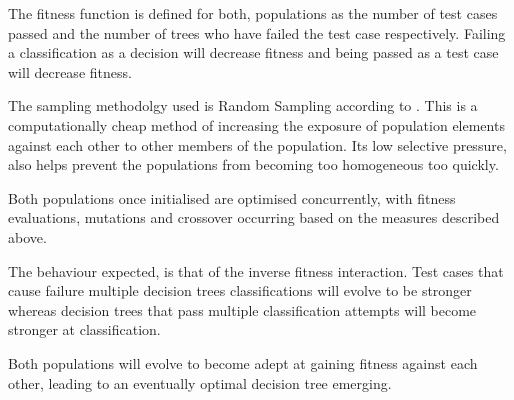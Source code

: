\documentclass[12pt]{article}
\begin{document}
The fitness function is defined for both, populations as the number of test cases passed and the number of trees who have failed the test case respectively. Failing a classification as a decision will decrease fitness and being passed as a test case will decrease fitness.

The sampling methodolgy used is Random Sampling according to \cite{reed_toombs_barricelli_1967}. This is a computationally cheap method of increasing the exposure of population elements against each other to other members of the population. Its low selective pressure, also helps prevent the populations from becoming too homogeneous too quickly.

Both populations once initialised are optimised concurrently, with fitness evaluations, mutations and crossover occurring based on the measures described above.

The behaviour expected, is that of the inverse fitness interaction. Test cases that cause failure multiple decision trees classifications will evolve to be stronger whereas decision trees that pass multiple classification attempts will become stronger at classification.

Both populations will evolve to become adept at gaining fitness against each other, leading to an eventually optimal decision tree emerging.


\end{document}
